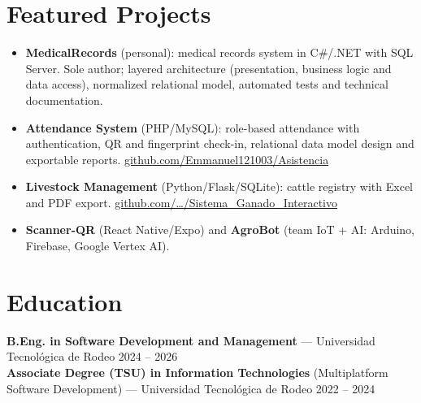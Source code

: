\documentclass[11pt,a4paper]{article}
\begin{document}
\section{Featured Projects}
\begin{itemize}
  \item \textbf{MedicalRecords} (personal): medical records system in C\#/.NET with SQL Server. Sole author; layered
        architecture (presentation, business logic and data access), normalized relational model, automated tests and
        technical documentation.
  \item \textbf{Attendance System} (PHP/MySQL): role-based attendance with authentication, QR and fingerprint check-in,
        relational data model design and exportable reports.
        \href{https://github.com/Emmanuel121003/Asistencia}{github.com/Emmanuel121003/Asistencia}
  \item \textbf{Livestock Management} (Python/Flask/SQLite): cattle registry with Excel and PDF export.
        \href{https://github.com/Emmanuel121003/Sistema_Ganado_Interactivo}{github.com/…/Sistema\_Ganado\_Interactivo}
  \item \textbf{Scanner-QR} (React Native/Expo) and \textbf{AgroBot} (team IoT + AI: Arduino, Firebase, Google Vertex AI).
\end{itemize}

\section{Education}
\textbf{B.Eng. in Software Development and Management} --- Universidad Tecnológica de Rodeo \hfill {\color{muted}\small 2024 -- 2026}\\[3pt]
\textbf{Associate Degree (TSU) in Information Technologies} (Multiplatform Software Development) --- Universidad Tecnológica de Rodeo \hfill {\color{muted}\small 2022 -- 2024}

\end{document}
